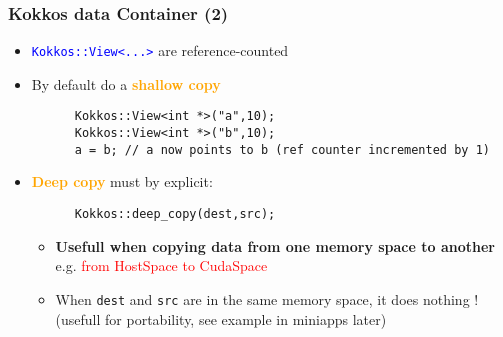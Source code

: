 \begin{frame}[fragile=singleslide]
  \frametitle{Kokkos data Container (2)}

  \begin{itemize}
  \item \textcolor{blue}{\texttt{Kokkos::View<...>}} are reference-counted
  \item By default do a \textcolor{orange}{\textbf{shallow copy}}
    \begin{verbatim}
      Kokkos::View<int *>("a",10);
      Kokkos::View<int *>("b",10);
      a = b; // a now points to b (ref counter incremented by 1)
    \end{verbatim}
  \item \textcolor{orange}{\textbf{Deep copy}} must by explicit:
    \begin{verbatim}
      Kokkos::deep_copy(dest,src);
    \end{verbatim}
    \begin{itemize}
    \item \textbf{Usefull when copying data from one memory space to another}\\
      e.g. \textcolor{red}{from HostSpace to CudaSpace}
    \item When \texttt{dest} and \texttt{src} are in the same memory space, it does nothing ! (usefull for portability, see example in miniapps later)
    \end{itemize}
  \end{itemize}

\end{frame}
